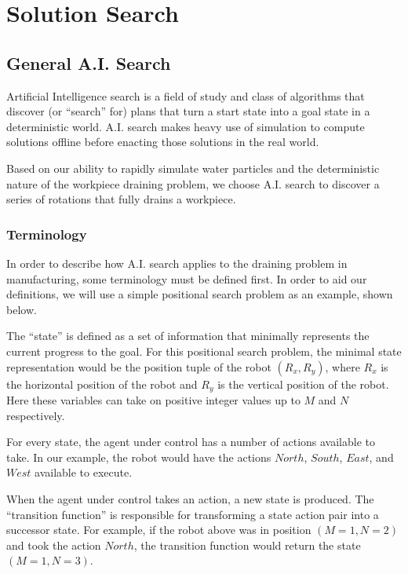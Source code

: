 								\chapter{Solution Search}

\section{General A.I. Search}

Artificial Intelligence search is a field of study and class of algorithms that discover (or ``search'' for) plans that turn a start state into a goal state in a deterministic world. A.I. search makes heavy use of simulation to compute solutions offline before enacting those solutions in the real world.

Based on our ability to rapidly simulate water particles and the deterministic nature of the workpiece draining problem, we choose A.I. search to discover a series of rotations that fully drains a workpiece.

	\subsection{Terminology}

In order to describe how A.I. search applies to the draining problem in manufacturing, some terminology must be defined first. In order to aid our definitions, we will use a simple positional search problem as an example, shown below.


The ``state'' is defined as a set of information that minimally represents the current progress to the goal. For this positional search problem, the minimal state representation would be the position tuple of the robot $(R_x,R_y)$, where $R_x$ is the horizontal position of the robot and $R_y$ is the vertical position of the robot. Here these variables can take on positive integer values up to $M$ and $N$ respectively.

For every state, the agent under control has a number of actions available to take. In our example, the robot would have the actions $North$, $South$, $East$, and $West$ available to execute.

When the agent under control takes an action, a new state is produced. The ``transition function'' is responsible for transforming a state action pair into a successor state. For example, if the robot above was in position $(M = 1, N = 2)$ and took the action $North$, the transition function would return the state $(M = 1, N = 3)$.

